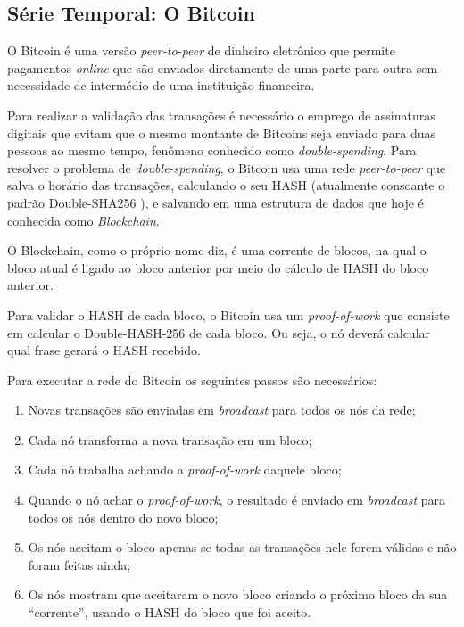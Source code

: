 \subsection{Série Temporal: O Bitcoin}
 
 O Bitcoin \cite{nakamoto2008bitcoin} é uma versão \emph{peer-to-peer} de dinheiro eletrônico que permite pagamentos \emph{online} que são enviados diretamente de uma parte para outra sem necessidade de intermédio de uma instituição financeira. 
 
 Para realizar a validação das transações é necessário o emprego de assinaturas digitais que evitam que o mesmo montante de Bitcoins seja enviado para duas pessoas ao mesmo tempo, fenômeno conhecido como \textit{double-spending}. Para  resolver o problema de \textit{ double-spending}, o Bitcoin usa uma rede \emph{peer-to-peer} que salva o horário das transações, calculando o seu HASH (atualmente consoante o padrão Double-SHA256 \cite{bitcoinwikihashcash}), e salvando em uma estrutura de dados que hoje é conhecida como \textit{Blockchain}.
 
O Blockchain, como o próprio nome diz, é uma corrente de blocos, na qual o bloco atual é ligado ao bloco anterior por meio do cálculo de HASH do bloco anterior. 

Para validar o HASH de cada bloco, o Bitcoin usa um \textit{proof-of-work} que consiste em calcular o Double-HASH-256 de cada bloco. Ou seja, o nó deverá calcular qual frase gerará o HASH recebido.

Para executar a rede do Bitcoin os seguintes passos são necessários:
\begin{enumerate}
\item Novas transações são enviadas em \textit{broadcast} para todos os nós da rede;
\item Cada nó transforma a nova transação em um bloco;
\item Cada nó trabalha achando a \textit{proof-of-work} daquele bloco;
\item Quando o nó achar o \textit{proof-of-work}, o resultado é enviado em \textit{broadcast} para todos os nós dentro do novo bloco;
\item Os nós aceitam o bloco apenas se todas as transações nele forem válidas e não foram feitas ainda;
\item Os nós mostram que aceitaram o novo bloco criando o próximo bloco da sua ``corrente'', usando o HASH do bloco que foi aceito.
\end{enumerate}

